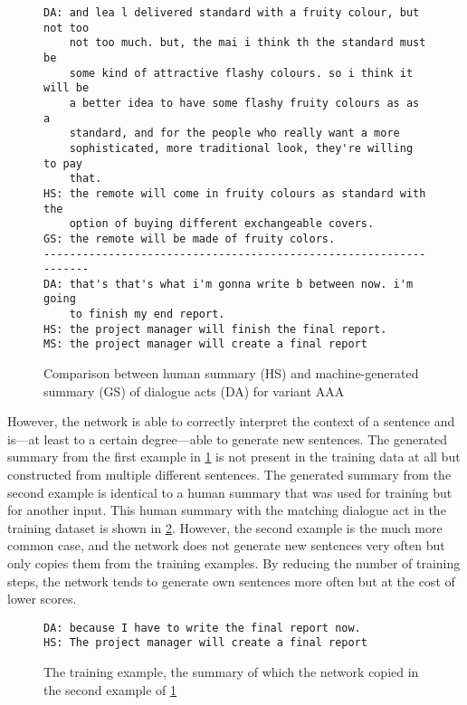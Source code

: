 \begin{figure}[h]
\begin{lstlisting}[numbers=none]
DA: and lea l delivered standard with a fruity colour, but not too
    not too much. but, the mai i think th the standard must be
    some kind of attractive flashy colours. so i think it will be 
    a better idea to have some flashy fruity colours as as a
    standard, and for the people who really want a more
    sophisticated, more traditional look, they're willing to pay
    that. 
HS: the remote will come in fruity colours as standard with the
    option of buying different exchangeable covers.
GS: the remote will be made of fruity colors.
------------------------------------------------------------------
DA: that's that's what i'm gonna write b between now. i'm going
    to finish my end report.
HS: the project manager will finish the final report.
MS: the project manager will create a final report
\end{lstlisting}
\caption[Comparison between human summary and machine-generated summary of dialogue acts for variant AAA]{Comparison between human summary (HS) and machine-generated summary (GS) of dialogue acts (DA) for variant AAA}
\label{fig:initial-experiment-example}
\end{figure}

However, the network is able to correctly interpret the context of a sentence and is---at least to a certain degree---able to generate new sentences.
The generated summary from the first example in \cref{fig:initial-experiment-example} is not present in the training data at all but constructed from multiple different sentences.
The generated summary from the second example is identical to a human summary that was used for training but for another input.
This human summary with the matching dialogue act in the training dataset is shown in \cref{fig:initial-experiment-training-example}.
However, the second example is the much more common case, and the network does not generate new sentences very often but only copies them from the training examples.
By reducing the number of training steps, the network tends to generate own sentences more often but at the cost of lower scores.

\begin{figure}[h]
\begin{lstlisting}[numbers=none]
DA: because I have to write the final report now.
HS: The project manager will create a final report
\end{lstlisting}
\caption{The training example, the summary of which the network copied in the second example of \cref{fig:initial-experiment-example}}
\label{fig:initial-experiment-training-example}
\end{figure}

